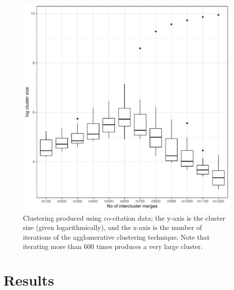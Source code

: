 \begin{figure}[ht]
\centering
  \includegraphics[scale=0.5]{merge_select.pdf}
\caption{Clustering produced using co-citation data; the y-axis is the cluster size (given logarithmically), and the x-axis is the number of iterations of the agglomerative clustering technique. Note that iterating more than 600 times produces a very large cluster.  }
\label{fig:merge_select}       %
\end{figure}

\section{Results}
\label{sec:results}

